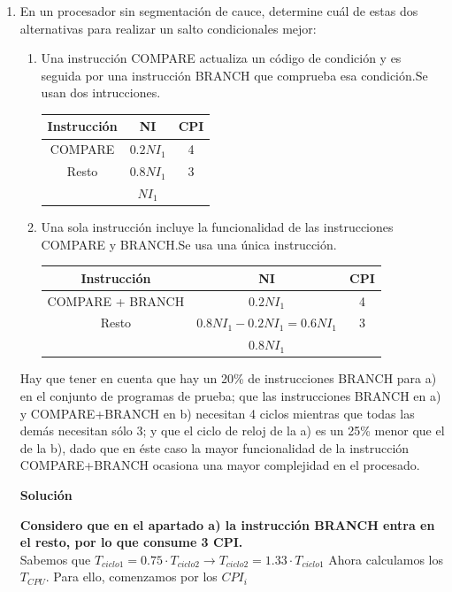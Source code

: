 \documentclass[12pt,spanish]{article}
\newenvironment{solution}{
	\par
	\textbf{Solución}
	\par
	\begin{center}
}
{
	\end{center}
}
\begin{document}
\begin{enumerate}
\begin{solution}
\end{solution}
\item En  un  procesador  sin  segmentación  de  cauce,  determine  cuál  de  estas  dos  alternativas  para realizar un salto condicionales mejor:
\begin{enumerate}
\item Una instrucción COMPARE actualiza un código de condición y es seguida por una instrucción BRANCH que comprueba esa condición.Se usan dos intrucciones.
\begin{table}[H]
\centering
\begin{tabular}{|c|c|c|}
\hline
\textbf{Instrucción} & \textbf{NI} & \textbf{CPI} \\
\hline
COMPARE & $0.2NI_1$ & 4 \\
\hline
Resto & $0.8NI_1$ & 3 \\
\hline
& $NI_1$ & \\
\hline
\end{tabular}
\end{table}
\item Una sola instrucción incluye la funcionalidad de las instrucciones COMPARE y BRANCH.Se usa una única instrucción.
\begin{table}[H]
\centering
\begin{tabular}{|c|c|c|}
\hline
\textbf{Instrucción} & \textbf{NI} & \textbf{CPI} \\
\hline
COMPARE + BRANCH & $0.2NI_1$ & 4 \\
\hline
Resto & $0.8NI_1-0.2NI_1=0.6NI_1$ & 3 \\
\hline
& $0.8NI_1$ & \\
\hline
\end{tabular}
\end{table}
\end{enumerate}
Hay que tener en cuenta que hay un 20\% de instrucciones BRANCH para a) en el conjunto de programas de prueba; que las instrucciones BRANCH en a) y COMPARE+BRANCH en b) necesitan 4  ciclos mientras que todas las demás necesitan sólo 3; y que el ciclo de reloj de la a) es un 25\% menor que el de la b), dado que en  éste caso la mayor funcionalidad de la instrucción COMPARE+BRANCH ocasiona una mayor complejidad en el procesado.
\begin{solution}
\textbf{Considero que en el apartado a) la instrucción BRANCH entra en el resto, por lo que consume 3 CPI.}\\
Sabemos que $T_{ciclo1}=0.75 \cdot T_{ciclo2} \rightarrow T_{ciclo2}=1.33 \cdot T_{ciclo1}$
Ahora calculamos los $T_{CPU}$. Para ello, comenzamos por los $CPI_i$

\end{solution}
\end{enumerate}
\end{document}
